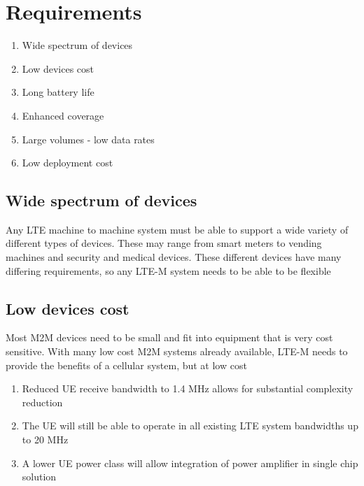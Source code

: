 \documentclass[12pt]{article}
\newcommand\tab[1][1cm]{\hspace*{#1}}
\begin{document}
\section{Requirements}
\begin{enumerate}
\item Wide spectrum of devices   
\item Low devices cost
\item Long battery life 
\item Enhanced coverage   
\item Large volumes - low data rates
\item Low deployment cost
\end{enumerate}
 
\begin{description}
\subsection{Wide spectrum of devices}
\item[\label{Wide spectrum of devices}]{
\tab Any LTE machine to machine system must be able to support a wide variety of different types of devices. These may range from smart meters to vending machines and security and medical devices. These different devices have many differing requirements, so any LTE-M system needs to be able to be flexible}
\subsection{Low devices cost}
 \item[\label{Low devices cost}]{
 \tab Most M2M devices need to be small and fit into equipment that is very cost sensitive. With many low cost M2M systems already available, LTE-M needs to provide the benefits of a cellular system, but at low cost
\begin{enumerate}
\item Reduced UE receive bandwidth to 1.4 MHz allows for substantial complexity reduction
\item The UE will still be able to operate in all existing LTE system bandwidths up to 20 MHz
\item A lower UE power class will allow integration of power amplifier in single chip solution
\end{enumerate}
}

\end{description}
\end{document}
